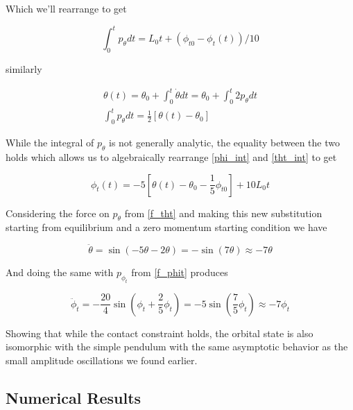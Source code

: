 \documentclass[prbg,preprint]{revtex4-1}
\begin{document}
Which we'll rearrange to get

\begin{equation}\label{phi_int}
	\int_0^t  p_{ \theta } dt
	= L_0t + (\phi_{t0}  - \phi_t(t))/10
\end{equation}

similarly

\begin{equation}\label{tht_int}
  \begin{multlined}
	\theta(t) 
	= \theta_{ 0} + \int_0^t  \dot \theta  dt
	= \theta_{ 0} + \int_0^t  2 p_{\theta} dt
	\\
	\int_0^t  p_{\theta} dt = \frac{1}{2}[\theta(t)-\theta_{0}]
  \end{multlined}
\end{equation}

While the integral of $p_\theta$ is not generally analytic, the equality between the two holds which allows us to algebraically rearrange \ref{phi_int} and \ref{tht_int} to get

\begin{equation}
	\phi_t(t)=  -5[\theta(t)-\theta_{0}-\frac{1}{5}\phi_{t0}] + 10L_0 t 
\end{equation}

Considering the force on $p_\theta$ from \ref{f_tht} and making this new substitution starting from equilibrium and a zero momentum starting condition we have

\begin{equation}
	\ddot \theta = \sin(-5\theta -2\theta) = -\sin(7\theta)\approx -7\theta
\end{equation}

And doing the same with $p_{\phi_t}$ from \ref{f_phit} produces

\begin{equation}
	\ddot \phi_t = -\frac{20}{4}\sin(\phi_t +\frac{2}{5}\phi_t) =  -5\sin\left ( \frac{7}{5}\phi_t \right )\approx -7\phi_t
\end{equation}

Showing that while the contact constraint holds, the orbital state is also isomorphic with the simple pendulum with the same asymptotic behavior as the small amplitude oscillations we found earlier.

\subsection{Numerical Results}
\end{document}
